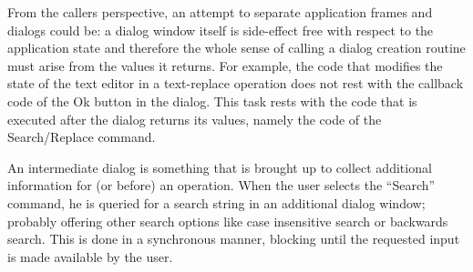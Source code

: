 \documentclass[twocolumn,a4paper]{article}
\newcommand {\concept} [1] {{\sl #1}\index{#1}}
\newcommand {\CLIM}{{\small CLIM}}
\begin{document}
From the callers perspective, an attempt to separate application frames and dialogs could be: a dialog window itself is side-effect free with respect to the application state and therefore the whole sense of calling a dialog creation routine must arise from the values it returns. For example, the code that modifies the state of the text editor in a text-replace operation does not rest with the callback code of the Ok button in the dialog. This task rests with the code that is executed after the dialog returns its values, namely the code of the Search/Replace command.


An intermediate dialog is something that is brought up to collect additional information for (or before) an operation. When the user selects the ``Search'' command, he is queried for a search string in an additional dialog window; probably offering other search options like case insensitive search or backwards search. This is done in a synchronous manner, blocking until the requested input is made available by the user.


\end{document}
